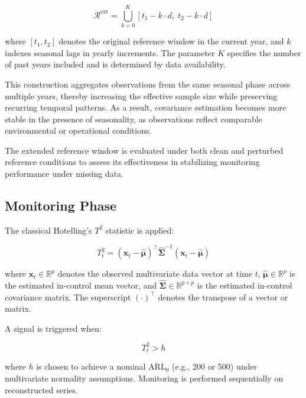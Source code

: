 \begin{equation}
\mathcal{R}^{\text{ext}} = \bigcup_{k=0}^{K}
\left[ t_1 - k \cdot d, \; t_2 - k \cdot d \right]
\label{eq:seasonal_reference}
\end{equation}

where \( [t_1, t_2] \) denotes the original reference window in the current year, and \( k \) indexes seasonal lags in yearly increments. The parameter \( K \) specifies the number of past years included and is determined by data availability.


This construction aggregates observations from the same seasonal phase across multiple years, thereby increasing the effective sample size while preserving recurring temporal patterns. As a result, covariance estimation becomes more stable in the presence of seasonality, as observations reflect comparable environmental or operational conditions.

The extended reference window is evaluated under both clean and perturbed reference conditions to assess its effectiveness in stabilizing monitoring performance under missing data.

\subsection{Monitoring Phase}

The classical Hotelling’s $T^2$ statistic is applied:

\begin{equation}
T_t^2 =
(\mathbf{x}_t - \widehat{\boldsymbol{\mu}})^\top
\widehat{\boldsymbol{\Sigma}}^{-1}
(\mathbf{x}_t - \widehat{\boldsymbol{\mu}})
\label{eq:hotelling_t2}
\end{equation}

where $\mathbf{x}_t \in \mathbb{R}^p$ denotes the observed multivariate data vector at time $t$, 
$\widehat{\boldsymbol{\mu}} \in \mathbb{R}^p$ is the estimated in-control mean vector, 
and $\widehat{\boldsymbol{\Sigma}} \in \mathbb{R}^{p \times p}$ is the estimated in-control covariance matrix. The superscript $(\cdot)^\top$ denotes the transpose of a vector or matrix.

A signal is triggered when:

\begin{equation}
T_t^2 > h
\label{eq:control_limit}
\end{equation}

where $h$ is chosen to achieve a nominal \ac{ARL}$_0$ (e.g., 200 or 500) under multivariate normality assumptions. Monitoring is performed sequentially on reconstructed series.

